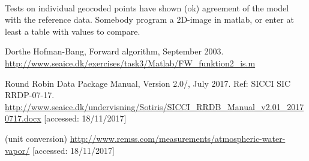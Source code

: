 \documentclass[11pt, a4paper]{article}
\begin{document}

\ \\
Tests on individual geocoded points have shown (ok) agreement of the model with the reference data. Somebody program a 2D-image in matlab, or enter at least a table with values to compare. \newline 




\begin{thebibliography}{99}
	 Dorthe Hofman-Bang, Forward algorithm, September 2003. \newline \url{http://www.seaice.dk/exercises/task3/Matlab/FW_funktion2_is.m} \newline [accessed: 18/11/2017]
	
	 Round Robin Data Package Manual, Version 2.0/, July 2017. Ref: SICCI SIC RRDP-07-17. \newline
	\url{http://www.seaice.dk/undervisning/Sotiris/SICCI_RRDB_Manual_v2.01_20170717.docx} [accessed: 18/11/2017]
	
	 (unit conversion) \url{http://www.remss.com/measurements/atmospheric-water-vapor/} [accessed: 18/11/2017]
	
\end{thebibliography}
\end{document}
